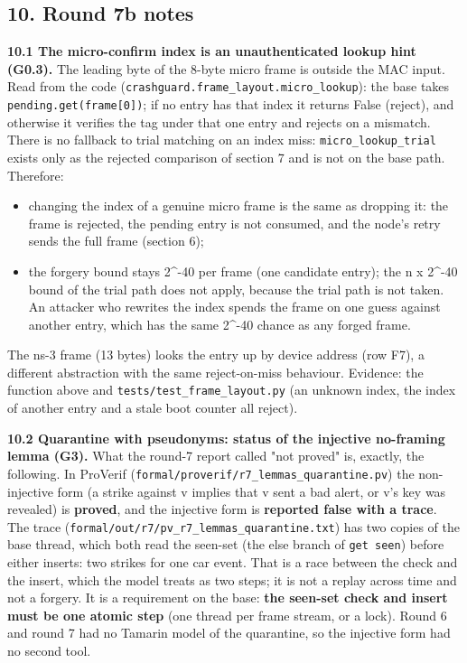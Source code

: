 \subsection*{10. Round 7b notes}

\textbf{10.1 The micro-confirm index is an unauthenticated lookup hint (G0.3).} The leading byte of the 8-byte micro frame is outside the MAC input. Read from the code (\texttt{crashguard.frame\_layout.micro\_lookup}): the base takes \texttt{pending.get(frame[0])}; if no entry has that index it returns False (reject), and otherwise it verifies the tag under that one entry and rejects on a mismatch. There is no fallback to trial matching on an index miss: \texttt{micro\_lookup\_trial} exists only as the rejected comparison of section 7 and is not on the base path. Therefore:

\begin{itemize}
\item changing the index of a genuine micro frame is the same as dropping it: the frame is rejected, the pending entry is not consumed, and the node's retry sends the full frame (section 6);
\item the forgery bound stays 2\textasciicircum{}-40 per frame (one candidate entry); the n x 2\textasciicircum{}-40 bound of the trial path does not apply, because the trial path is not taken. An attacker who rewrites the index spends the frame on one guess against another entry, which has the same 2\textasciicircum{}-40 chance as any forged frame.
\end{itemize}

The ns-3 frame (13 bytes) looks the entry up by device address (row F7), a different abstraction with the same reject-on-miss behaviour. Evidence: the function above and \texttt{tests/test\_frame\_layout.py} (an unknown index, the index of another entry and a stale boot counter all reject).

\textbf{10.2 Quarantine with pseudonyms: status of the injective no-framing lemma (G3).} What the round-7 report called "not proved" is, exactly, the following. In ProVerif (\texttt{formal/proverif/r7\_lemmas\_quarantine.pv}) the non-injective form (a strike against v implies that v sent a bad alert, or v's key was revealed) is \textbf{proved}, and the injective form is \textbf{reported false with a trace}. The trace (\texttt{formal/out/r7/pv\_r7\_lemmas\_quarantine.txt}) has two copies of the base thread, which both read the seen-set (the else branch of \texttt{get seen}) before either inserts: two strikes for one car event. That is a race between the check and the insert, which the model treats as two steps; it is not a replay across time and not a forgery. It is a requirement on the base: \textbf{the seen-set check and insert must be one atomic step} (one thread per frame stream, or a lock). Round 6 and round 7 had no Tamarin model of the quarantine, so the injective form had no second tool.

